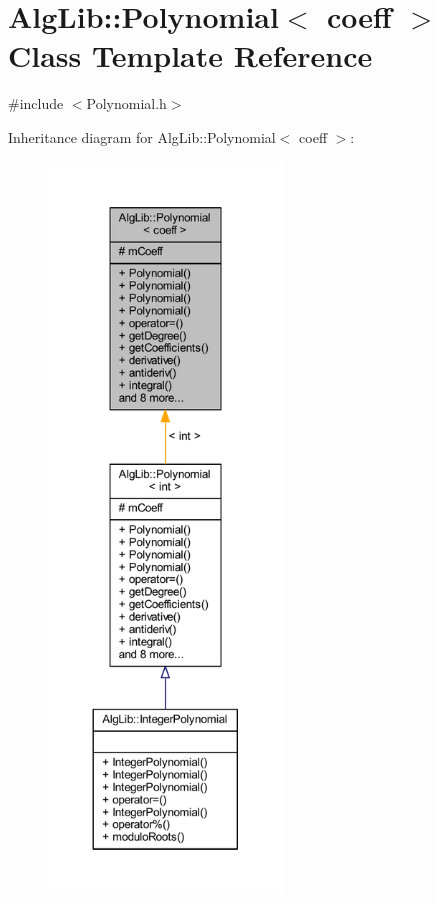 \hypertarget{class_alg_lib_1_1_polynomial}{}\section{Alg\+Lib\+:\+:Polynomial$<$ coeff $>$ Class Template Reference}
\label{class_alg_lib_1_1_polynomial}


{\ttfamily \#include $<$Polynomial.\+h$>$}



Inheritance diagram for Alg\+Lib\+:\+:Polynomial$<$ coeff $>$\+:\nopagebreak
\begin{figure}[H]
\begin{center}
\leavevmode
\includegraphics[height=550pt]{class_alg_lib_1_1_polynomial__inherit__graph}
\end{center}
\end{figure}


